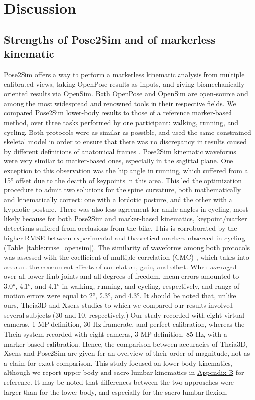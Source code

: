 \section{Discussion}

\subsection{Strengths of Pose2Sim and of markerless kinematic}

Pose2Sim offers a way to perform a markerless kinematic analysis from multiple calibrated views, taking OpenPose results as inputs, and giving biomechanically oriented results via OpenSim. Both OpenPose and OpenSim are open-source and among the most widespread and renowned tools in their respective fields. We compared Pose2Sim lower-body results to those of a reference marker-based method, over three tasks performed by one participant: walking, running, and cycling. Both protocols were as similar as possible, and used the same constrained skeletal model in order to ensure that there was no discrepancy in results caused by different definitions of anatomical frames \cite{Croce1999}. Pose2Sim kinematic waveforms were very similar to marker-based ones, especially in the sagittal plane. One exception to this observation was the hip angle in running, which suffered from a 15° offset due to the dearth of keypoints in this area. This led the optimization procedure to admit two solutions for the spine curvature, both mathematically and kinematically correct: one with a lordotic posture, and the other with a kyphotic posture. There was also less agreement for ankle angles in cycling, most likely because for both Pose2Sim and marker-based kinematics, keypoint/marker detections suffered from occlusions from the bike. This is corroborated by the higher RMSE between experimental and theoretical markers observed in cycling (Table~\ref{table:rmse_opensim}). The similarity of waveforms among both protocols was assessed with the coefficient of multiple correlation (CMC) \cite{Ferrari2010}, which takes into account the concurrent effects of correlation, gain, and offset. When averaged over all lower-limb joints and all degrees of freedom, mean errors amounted to 3.0°, 4.1°, and 4.1° in walking, running, and cycling, respectively, and range of motion errors were equal to 2°, 2.3°, and 4.3°. It should be noted that, unlike ours, Theia3D \cite{Kanko2021b} and Xsens \cite{Zhang2013} studies to which we compared our results involved several subjects (30 and 10, respectively.) Our study recorded with eight virtual cameras, 1 MP definition, 30 Hz framerate, and perfect calibration, whereas the Theia system recorded with eight cameras, 3 MP definition, 85 Hz, with a marker-based calibration. Hence, the comparison between accuracies of Theia3D, Xsens and Pose2Sim are given for an overview of their order of magnitude, not as a claim for exact comparison. This study focused on lower-body kinematics, although we report upper-body and sacro-lumbar kinematics in \hyperref[Ann:2]{Appendix B} for reference. It may be noted that differences between the two approaches were larger than for the lower body, and especially for the sacro-lumbar flexion.

